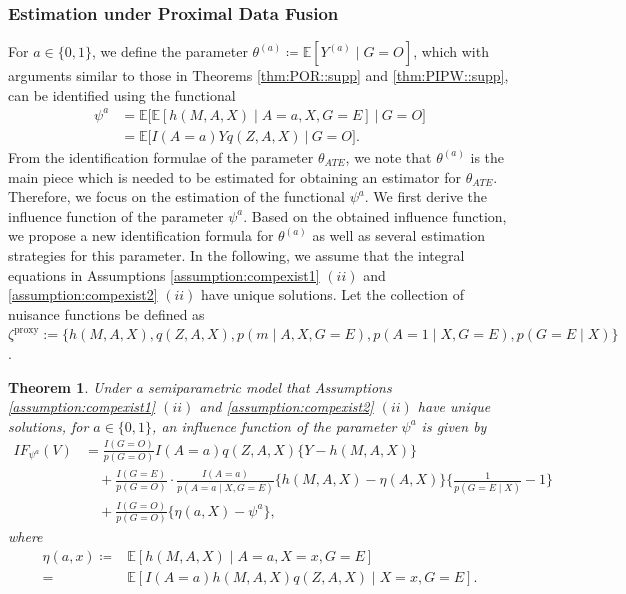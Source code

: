 \documentclass[10pt]{article}
\newtheorem{theorem}{Theorem}
\newcommand{\E}{\mathbb{E}}
\begin{document}
\subsubsection{Estimation under Proximal Data Fusion}
For $a\in\{0,1\}$, we define the parameter $\theta^{(a)}\coloneqq\E[Y^{(a)}\mid G=O]$, which with arguments similar to those in Theorems \ref{thm:POR::supp} and \ref{thm:PIPW::supp}, can be identified using the functional
\begin{align}
\psi^a
&=\E\big[\E[h(M,A,X)\mid A=a,X,G=E]~\big|~  G=O\big]\label{eq:theta-id1}\\
&=\E\big[I(A=a)Yq(Z,A,X)~\big|~G=O\big]\label{eq:theta-id2}.
\end{align}
From the identification formulae of the parameter $\theta_{ATE}$, we note that $\theta^{(a)}$ is the main piece which is needed to be estimated for obtaining an estimator for $\theta_{ATE}$. Therefore, we focus on the estimation of the functional $\psi^a$.
We first derive the influence function of the parameter $\psi^a$. Based on the obtained influence function, we propose a new identification formula for $\theta^{(a)}$ as well as several estimation strategies for this parameter. In the following, we assume that the integral equations in Assumptions \ref{assumption:compexist1} $(ii)$ and \ref{assumption:compexist2} $(ii)$ have unique solutions. Let the collection of nuisance functions be defined as $\zeta^{\text{proxy}}:=\Big\{
h(M,A,X),q(Z,A,X), p(m\mid A,X,G=E), p(A=1\mid X,G=E),  p(G=E\mid X)\Big\}$.


\begin{theorem}
\label{thm:IF:proximal}	
Under a semiparametric model that Assumptions \ref{assumption:compexist1} $(ii)$ and \ref{assumption:compexist2} $(ii)$ have unique solutions, for $a\in\{0,1\}$, an influence function of the parameter $\psi^a$ is given by
\begin{align*}
IF_{\psi^a}(V)&=
\frac{I(G=O)}{p(G=O)}I(A=a)q(Z,A,X)\{Y-h(M,A,X)\}\\
&\quad+\frac{I(G=E)}{p(G=O)}\cdot\frac{I(A=a)}{p(A=a\mid X,G=E)}
\{h(M,A,X)-\eta(A,X)\}\{\frac{1}{p(G=E\mid X)}-1\}\\
&\quad+\frac{I(G=O)}{p(G=O)}\{\eta(a,X)-\psi^a\},
\end{align*}
where
\begin{align*}
\eta(a,x)\coloneqq&\E[h(M,A,X)\mid A=a,X=x,G=E]\\
=&\E[ I(A=a)h(M,A,X)q(Z,A,X)\mid X=x,G=E ].
\end{align*}
\end{theorem}
\end{document}
